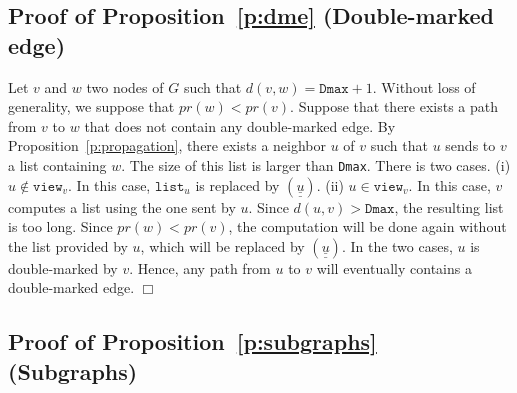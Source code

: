 \documentclass[11pt,english]{article}
\newenvironment{proof}[1][0cm]{
  \begin{list}{\bf Proof.~}{
      \setlength{\itemindent}{0cm}
      \setlength{\labelsep}{0cm}
      \setlength{\labelwidth}{#1}
      \setlength{\leftmargin}{#1}
    \item
    }
}{\hfill$\Box$
  \end{list}
}
\begin{document}
\subsection{Proof of Proposition~\ref{p:dme} (Double-marked edge)}

\begin{proof}
  Let $v$ and $w$ two nodes of $G$ such that $d(v,w) = \texttt{Dmax} + 1$. Without loss
  of generality, we suppose that $pr(w) < pr(v)$. Suppose that there exists a
  path from $v$ to $w$ that does not contain any double-marked edge. By
  Proposition~\ref{p:propagation}, there exists a neighbor $u$ of $v$ such that
  $u$ sends to $v$ a list containing $w$. The size of this list is larger than
  \texttt{Dmax}. There is two cases.
(i) $u \not\in \texttt{view}_v$. In this case, $\texttt{list}_u$ is
    replaced by $(\underline{\underline{u}})$.
(ii) $u \in \texttt{view}_v$. In this case, $v$ computes a list using the
    one sent by $u$. Since $d(u,v) > \texttt{Dmax}$, the resulting list is too
    long. Since $pr(w) < pr(v)$, the computation will be done again without the
    list provided by $u$, which will be replaced by
    $(\underline{\underline{u}})$.
In the two cases, $u$ is double-marked by $v$. Hence, any path from $u$ to $v$
  will eventually contains a double-marked edge.
\end{proof}

\subsection{Proof of Proposition~\ref{p:subgraphs} (Subgraphs)}
\end{document}
